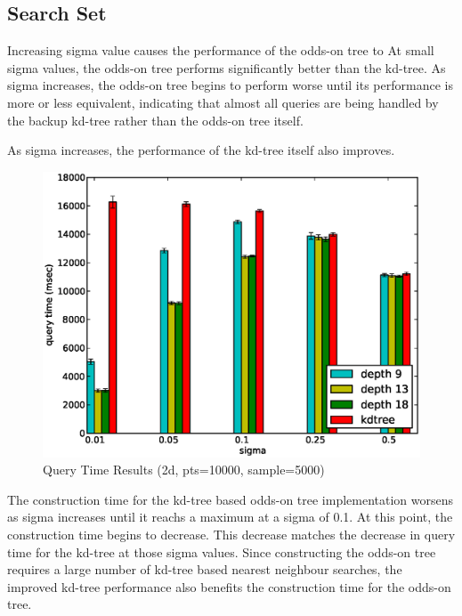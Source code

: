 \documentclass[mcs]{scsthesis}
\begin{document}
\subsection{Search Set}

Increasing sigma value causes the performance of the odds-on tree to
At small sigma values, the odds-on tree performs significantly better than
the kd-tree. As sigma increases, the odds-on tree begins to perform worse
until its performance is more or less equivalent, indicating that almost
all queries are being handled by the backup kd-tree rather than the odds-on
tree itself.

As sigma increases, the performance of the kd-tree itself also improves.

\begin{figure}
\begin{center}
\includegraphics[scale=0.5]{diagrams/2d_pts10000_sample5000_qtime.eps}
\caption{Query Time Results (2d, pts=10000, sample=5000)}
\end{center}
\end{figure}


The construction time for the kd-tree based odds-on tree implementation worsens
as sigma increases until it reachs a maximum at a sigma of 0.1. At this point,
the construction time begins to decrease. This decrease matches the decrease
in query time for the kd-tree at those sigma values. Since constructing the
odds-on tree requires a large number of kd-tree based nearest neighbour
searches, the improved kd-tree performance also benefits the construction time
for the odds-on tree.
\end{document}
